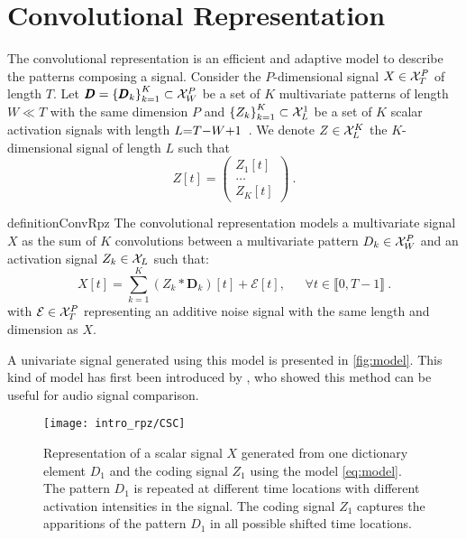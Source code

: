 \documentclass[../thesis.tex]{subfiles}
\begin{document}
\section{Convolutional Representation} 
\label{sec:conv_DL_model}

	The convolutional representation is an efficient and adaptive
	model to describe the patterns composing a signal. Consider the $P$-dimensional
	signal $X \in {\mathcal X}_T^P$ of length $T$.	Let $\pmb D = \left \{ {\pmb D}_k \right \}_{k=1}^K
	\subset {\mathcal X}_W^P$ be a set of $K$ multivariate patterns of length $W \ll T$
	with the same dimension $P$ and $\left \{ Z_k \right \}_{k=1}^K \subset
	{\mathcal X}_L^1$ be a set of $K$ scalar activation signals with length
	$\smeq L = T-W+1$~. We denote $Z \in {\mathcal X}_L^K$ the $K$-dimensional signal
	of length $L$ such that
	\[
		Z[t] = \begin{pmatrix} Z_1[t]\\\dots\\Z_K[t] \end{pmatrix}~.
	\]

	\begin{restatable}{definition}{ConvRpz}
	\label{def:conv_rpz}
		The convolutional representation models a multivariate signal $X$ as the sum of
		$K$ convolutions between a multivariate pattern $D_k \in {\mathcal X}_W^P$ and an
		activation signal $Z_k \in {\mathcal X}_L$
		such that:
		\begin{equation}
		\label{eq:model}
			X[t] =  \sum_{k=1}^K (Z_k*{\pmb D}_{k})[t] +\mathcal{E}[t],
			~~~~~~~\forall t\in \llbracket 0, T-1\rrbracket~.
		\end{equation}
		with $\mathcal{E} \in {\mathcal X}_T^P$ representing an additive noise signal
		with the same length and dimension as $X$.
	\end{restatable}

	A univariate signal generated
	using this model is presented in \autoref{fig:model}. This kind of model
	has first been introduced by \citet{Grosse2007}, who showed this method
	can be useful for audio signal comparison.



\begin{figure}[htp]
\centering
\texttt{[image: intro\_rpz/CSC]}
\caption{Representation of a scalar signal $X$ generated from one dictionary
element $D_1$ and the coding signal $Z_1$ using the model \autoref{eq:model}.
The pattern $D_1$ is repeated at different time locations with different activation
intensities in the signal. The coding signal $Z_1$ captures the apparitions of
the pattern $D_1$ in all possible shifted time locations.}
\label{fig:model}
\end{figure}
\end{document}
